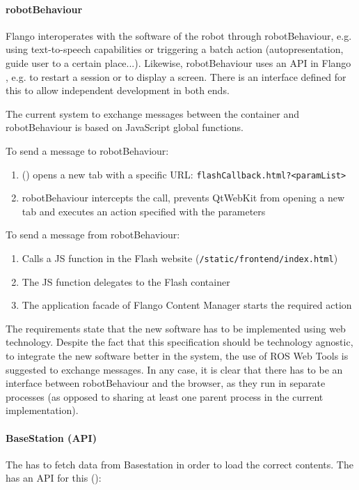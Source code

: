 \paragraph{robotBehaviour} Flango \cm interoperates with the software of the robot through robotBehaviour, e.g. using text-to-speech capabilities or triggering a batch action (autopresentation, guide user to a certain place...).
Likewise, robotBehaviour uses an \ac{API} in Flango \cm , e.g. to restart a session or to display a screen.
There is an interface defined for this to allow independent development in both ends.

The current system to exchange messages between the \flash container and robotBehaviour is based on JavaScript global functions.

To send a message to robotBehaviour:
\begin{enumerate}
    \item \cm (\flash) opens a new tab with a specific \ac{URL}: \texttt{flashCallback.html?\textless paramList\textgreater}
    \item robotBehaviour intercepts the call, prevents QtWebKit from opening a new tab and executes an action specified with the parameters
\end{enumerate}

To send a message from robotBehaviour:
\begin{enumerate}
    \item Calls a \ac{JS} function in the Flash website (\texttt{/static/frontend/index.html})
    \item The \ac{JS} function delegates to the Flash container
    \item The application facade of Flango Content Manager starts the required action
\end{enumerate}

The requirements state that the new software has to be implemented using web technology. 
Despite the fact that this specification should be technology agnostic, to integrate the new software better in the system, the use of \ac{ROS} Web Tools is suggested to exchange messages.
In any case, it is clear that there has to be an interface between robotBehaviour and the browser, as they run in separate processes (as opposed to sharing at least one parent process in the current implementation).

\paragraph{BaseStation (\flangobe \ac{API})} The \cm has to fetch data from Basestation in order to load the correct contents.
The \flangobe has an \ac{API} for this ():

